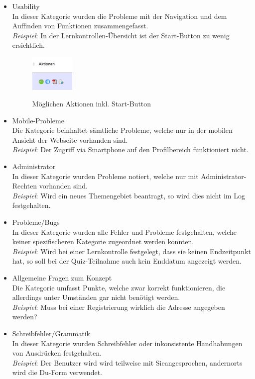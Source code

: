 \begin{itemize}
		
		\item Usability \\
		In dieser Kategorie wurden die Probleme mit der Navigation und dem Auffinden von Funktionen zusammengefasst. \\
		\textit{Beispiel}: In der Lernkontrollen-Übersicht ist der Start-Button zu wenig ersichtlich.
		\begin{figure}[H]
			\centering
			\includegraphics[width=0.20\textwidth]
			{Images/MobileQuizAlteVersionStartbutton.png}
			\caption{Möglichen Aktionen inkl. Start-Button}
			\cite{mobilequiz.ch}
		\end{figure}
		\item Mobile-Probleme \\
		Die Kategorie beinhaltet sämtliche Probleme, welche nur in der mobilen Ansicht der Webseite vorhanden sind. \\
		\textit{Beispiel}: Der Zugriff via Smartphone auf den Profilbereich funktioniert nicht.
		\item Administrator \\
		In dieser Kategorie wurden Probleme notiert, welche nur mit Administrator-Rechten vorhanden sind. \\
		\textit{Beispiel}: Wird ein neues Themengebiet beantragt, so wird dies nicht im Log festgehalten.
		\item Probleme/Bugs \\
		In dieser Kategorie wurden alle Fehler und Probleme festgehalten, welche keiner spezifischeren Kategorie zugeordnet werden konnten. \\
		\textit{Beispiel}: Wird bei einer Lernkontrolle festgelegt, dass sie keinen Endzeitpunkt hat, so soll bei der Quiz-Teilnahme auch kein Enddatum angezeigt werden.
		\item Allgemeine Fragen zum Konzept \\
		Die Kategorie umfasst Punkte, welche zwar korrekt funktionieren, die allerdings unter Umständen gar nicht benötigt werden. \\
		\textit{Beispiel}: Muss bei einer Registrierung wirklich die Adresse angegeben werden?
		\item Schreibfehler/Grammatik \\
		In dieser Kategorie wurden Schreibfehler oder inkonsistente Handhabungen von Ausdrücken festgehalten. \\
		\textit{Beispiel}: Der Benutzer wird wird teilweise mit \glq Sie\grq angesprochen, andernorts wird die \glq Du\grq-Form verwendet.
	\end{itemize}

